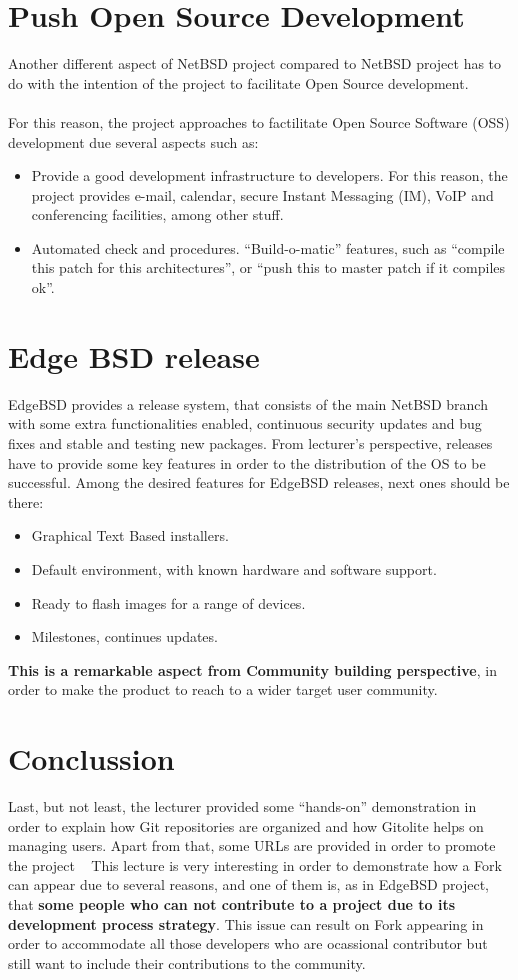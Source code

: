 \documentclass[11pt]{article}
\begin{document}
\section{Push Open Source Development}
Another different aspect of NetBSD project compared to NetBSD project has to do with the intention of the project to facilitate Open Source development.\\
\\
For this reason, the project approaches to factilitate Open Source Software (OSS) development due several aspects such as:
\begin{itemize}
\item{Provide a good development infrastructure to developers}. For this reason, the project provides e-mail, calendar, secure Instant Messaging (IM), VoIP and conferencing facilities, among other stuff.
\item{Automated check and procedures}. ``Build-o-matic'' features, such as ``compile this patch for this architectures'', or ``push this to master patch if it compiles ok''.
\end{itemize}

\section{Edge BSD release}
EdgeBSD provides a release system, that consists of the main NetBSD branch with some extra functionalities enabled, continuous security updates and bug fixes and stable and testing new packages.
From lecturer's perspective, releases have to provide some key features in order to the distribution of the OS to be successful. Among the desired features for EdgeBSD releases, next ones should be there:
\begin{itemize}
\item{Graphical Text Based installers}.
\item{Default environment, with known hardware and software support}.
\item{Ready to flash images for a range of devices}.
\item{Milestones, continues updates}.
\end{itemize}
\textbf{This is a remarkable aspect from Community building perspective}, in order to make the product to reach to a wider target user community.

\section{Conclussion}
Last, but not least, the lecturer provided some ``hands-on'' demonstration in order to explain how Git repositories are organized and how Gitolite helps on managing users. Apart from that, some URLs are provided in order to promote the project ~\cite{EDGE00}
This lecture is very interesting in order to demonstrate how a Fork can appear due to several reasons, and one of them is, as in EdgeBSD project, that \textbf{some people who can not contribute to a project due to its development process strategy}. This issue can result on Fork appearing in order to accommodate all those developers who are ocassional contributor but still want to include their contributions to the community.


{}
\end{document}
